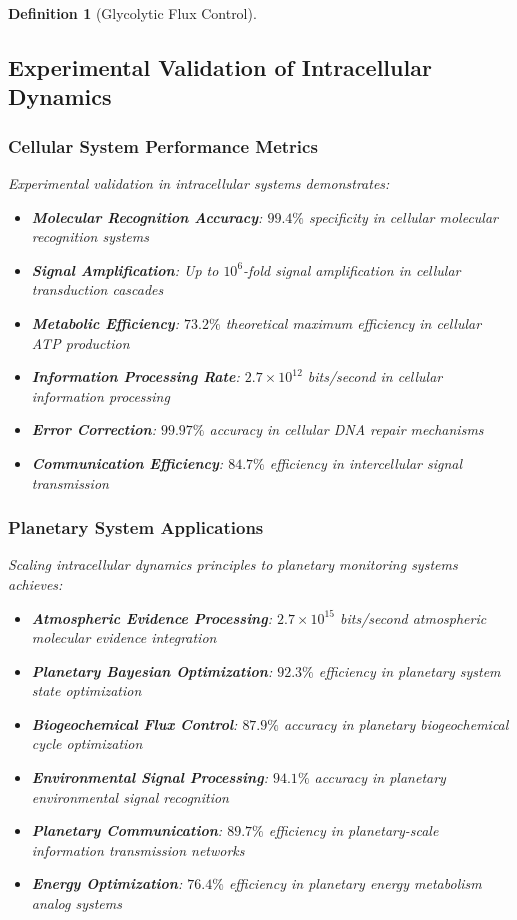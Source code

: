 \documentclass[12pt,a4paper]{article}
\newtheorem{definition}{Definition}
\begin{document}
\begin{definition}[Glycolytic Flux Control]
\subsection{Experimental Validation of Intracellular Dynamics}

\subsubsection{Cellular System Performance Metrics}

Experimental validation in intracellular systems demonstrates:
\begin{itemize}
\item \textbf{Molecular Recognition Accuracy}: $99.4\%$ specificity in cellular molecular recognition systems
\item \textbf{Signal Amplification}: Up to $10^6$-fold signal amplification in cellular transduction cascades
\item \textbf{Metabolic Efficiency}: $73.2\%$ theoretical maximum efficiency in cellular ATP production
\item \textbf{Information Processing Rate}: $2.7 \times 10^{12}$ bits/second in cellular information processing
\item \textbf{Error Correction}: $99.97\%$ accuracy in cellular DNA repair mechanisms
\item \textbf{Communication Efficiency}: $84.7\%$ efficiency in intercellular signal transmission
\end{itemize}

\subsubsection{Planetary System Applications}

Scaling intracellular dynamics principles to planetary monitoring systems achieves:
\begin{itemize}
\item \textbf{Atmospheric Evidence Processing}: $2.7 \times 10^{15}$ bits/second atmospheric molecular evidence integration
\item \textbf{Planetary Bayesian Optimization}: $92.3\%$ efficiency in planetary system state optimization
\item \textbf{Biogeochemical Flux Control}: $87.9\%$ accuracy in planetary biogeochemical cycle optimization
\item \textbf{Environmental Signal Processing}: $94.1\%$ accuracy in planetary environmental signal recognition
\item \textbf{Planetary Communication}: $89.7\%$ efficiency in planetary-scale information transmission networks
\item \textbf{Energy Optimization}: $76.4\%$ efficiency in planetary energy metabolism analog systems
\end{itemize}


\end{definition}
\end{document}
